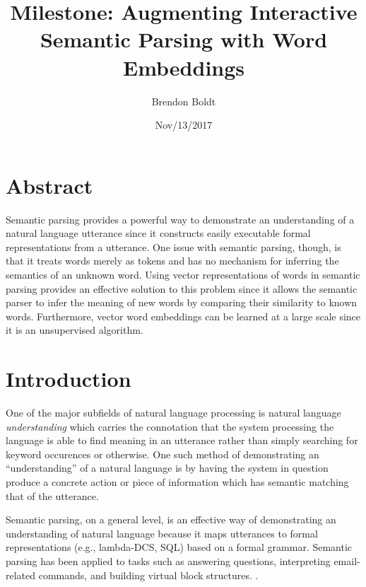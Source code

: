 \documentclass[a4paper]{article}
\title{Milestone: Augmenting Interactive Semantic Parsing with Word Embeddings}
\author{Brendon Boldt}
\date{Nov/13/2017}
\begin{document}





\maketitle


\section*{Abstract}

Semantic parsing provides a powerful way to demonstrate an understanding of a
natural language utterance since it constructs easily executable formal
representations from a utterance. One issue with semantic parsing, though,
is that it treats words merely as tokens and has no mechanism for inferring
the semantics of an unknown word. Using vector representations of words
in semantic parsing provides an effective solution to this problem since
it allows the semantic parser to infer the meaning of new words by comparing
their similarity to known words. Furthermore, vector word embeddings can
be learned at a large scale since it is an unsupervised algorithm.

\section{Introduction}

One of the major subfields of natural language processing is natural language
\textit{understanding} which carries the connotation that the system processing
the language is able to find meaning in an utterance rather than simply
searching for keyword occurences or otherwise. %
One such method of demonstrating an ``understanding'' of a natural language is
by having the system in question produce a concrete action or piece of
information which has semantic matching that of the utterance.

Semantic parsing, on a general level, is an effective way of demonstrating an
understanding of natural language because it maps utterances to
formal representations (e.g., lambda-DCS, SQL) based on a formal grammar.
Semantic parsing has been applied to tasks such as answering questions,
interpreting email-related commands, and building virtual block structures.
\cite{AAAI1612383}
\cite{DBLP:conf/emnlp/BerantCFL13}
\cite{DBLP:journals/corr/WangGLM17}.
\end{document}
